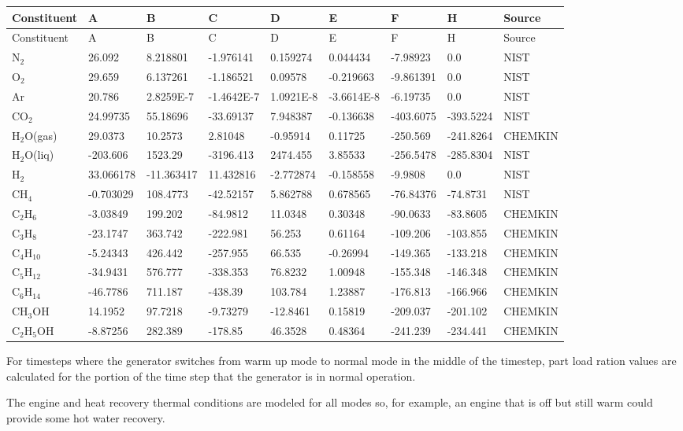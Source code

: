 {\scriptsize
\begin{longtable}[c]{p{0.6in}p{0.6in}p{0.6in}p{0.6in}p{0.6in}p{0.6in}p{0.6in}p{0.6in}p{0.6in}}
\toprule 
Constituent & A & B & C & D & E & F & H & Source \tabularnewline
\midrule
\endfirsthead

\toprule 
Constituent & A & B & C & D & E & F & H & Source \tabularnewline
\midrule
\endhead

N\(_{2}\) & 26.092 & 8.218801 & -1.976141 & 0.159274 & 0.044434 & -7.98923 & 0.0 & NIST \tabularnewline
O\(_{2}\) & 29.659 & 6.137261 & -1.186521 & 0.09578 & -0.219663 & -9.861391 & 0.0 & NIST \tabularnewline
Ar & 20.786 & 2.8259E-7 & -1.4642E-7 & 1.0921E-8 & -3.6614E-8 & -6.19735 & 0.0 & NIST \tabularnewline
CO\(_{2}\) & 24.99735 & 55.18696 & -33.69137 & 7.948387 & -0.136638 & -403.6075 & -393.5224 & NIST \tabularnewline
H\(_{2}\)O(gas) & 29.0373 & 10.2573 & 2.81048 & -0.95914 & 0.11725 & -250.569 & -241.8264 & CHEMKIN \tabularnewline
H\(_{2}\)O(liq) & -203.606 & 1523.29 & -3196.413 & 2474.455 & 3.85533 & -256.5478 & -285.8304 & NIST \tabularnewline
H\(_{2}\) & 33.066178 & -11.363417 & 11.432816 & -2.772874 & -0.158558 & -9.9808 & 0.0 & NIST \tabularnewline
CH\(_{4}\) & -0.703029 & 108.4773 & -42.52157 & 5.862788 & 0.678565 & -76.84376 & -74.8731 & NIST \tabularnewline
C\(_{2}\)H\(_{6}\) & -3.03849 & 199.202 & -84.9812 & 11.0348 & 0.30348 & -90.0633 & -83.8605 & CHEMKIN \tabularnewline
C\(_{3}\)H\(_{8}\) & -23.1747 & 363.742 & -222.981 & 56.253 & 0.61164 & -109.206 & -103.855 & CHEMKIN \tabularnewline
C\(_{4}\)H\(_{10}\) & -5.24343 & 426.442 & -257.955 & 66.535 & -0.26994 & -149.365 & -133.218 & CHEMKIN \tabularnewline
C\(_{5}\)H\(_{12}\) & -34.9431 & 576.777 & -338.353 & 76.8232 & 1.00948 & -155.348 & -146.348 & CHEMKIN \tabularnewline
C\(_{6}\)H\(_{14}\) & -46.7786 & 711.187 & -438.39 & 103.784 & 1.23887 & -176.813 & -166.966 & CHEMKIN \tabularnewline
CH\(_{3}\)OH & 14.1952 & 97.7218 & -9.73279 & -12.8461 & 0.15819 & -209.037 & -201.102 & CHEMKIN \tabularnewline
C\(_{2}\)H\(_{5}\)OH & -8.87256 & 282.389 & -178.85 & 46.3528 & 0.48364 & -241.239 & -234.441 & CHEMKIN \tabularnewline
\bottomrule
\end{longtable}}

For timesteps where the generator switches from warm up mode to normal mode in the middle of the timestep, part load ration values are calculated for the portion of the time step that the generator is in normal operation.

The engine and heat recovery thermal conditions are modeled for all modes so, for example, an engine that is off but still warm could provide some hot water recovery.

